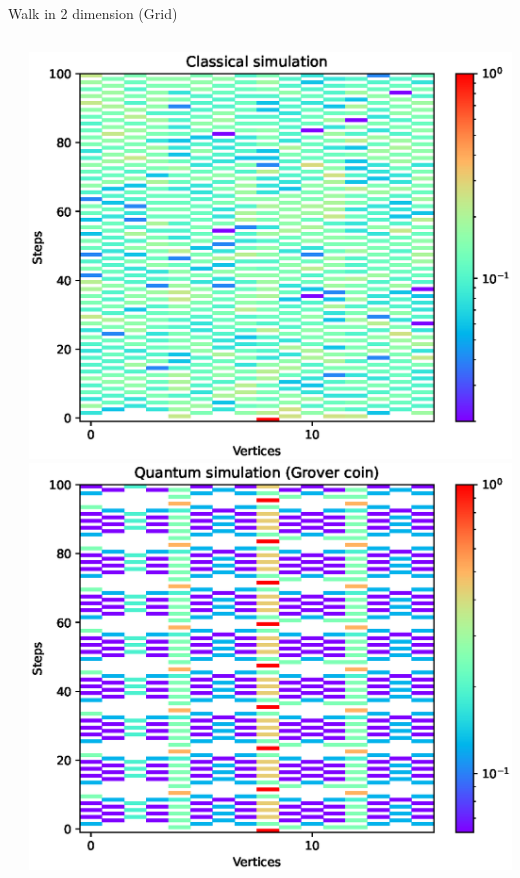 \documentclass[aspectratio=169]{beamer}
\begin{document}
\begin{frame}{Walk in 2 dimension (Grid)}
  \begin{columns}[onlytextwidth]
    \begin{column}{.20\textwidth}
    \end{column}
    \begin{column}{.30\textwidth}
      \includegraphics[width=\textwidth]{./figures/results/grid_horizontal_vertical/classical.eps}
      \vspace{-1em} %
      \includegraphics[width=\textwidth]{./figures/results/grid_horizontal_vertical/grover.eps}

\end{column}
\end{columns}
\end{frame}
\end{document}
